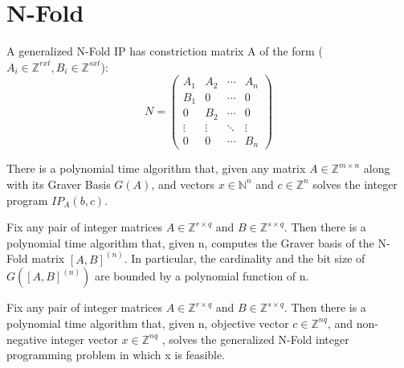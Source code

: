 \chapter{N-Fold} \label{methodology}



A generalized N-Fold IP has constriction matrix A of the form ($A_i \in \mathbb{Z}^{rxt}, B_i \in \mathbb{Z}^{sxt}$):\\
\begin{equation*}
N = 
\begin{pmatrix}
A_1 & A_2 & \cdots & A_n \\
B_1 & 0   & \cdots & 0 \\
0   & B_2 & \cdots & 0 \\
\vdots    & \vdots & \ddots & \vdots  \\
0   & 0   & \cdots & B_n 
\end{pmatrix}
\end{equation*}



\begin{proposition}
There is a polynomial time algorithm that, given any matrix $A \in \mathbb{Z}^{m \times n}$ along with its Graver Basis $G(A)$, and vectors $x \in \mathbb{N}^n$ and $c \in \mathbb{Z}^n$ solves the integer program $IP_A(b,c)$. 
\end{proposition}

\begin{proposition}
Fix any pair of integer matrices $A \in \mathbb{Z}^{r \times q}$ and $B \in \mathbb{Z}^{s \times q}$. Then there is a polynomial time algorithm that, given n, computes the Graver basis of the N-Fold matrix $[A,B]^{(n)}$. In particular, the cardinality and the bit size of $G([A, B]^(n))$ are bounded by a polynomial function of n.
\end{proposition}

\begin{proposition}
Fix any pair of integer matrices $A \in \mathbb{Z}^{r \times q}$ and $B \in \mathbb{Z}^{s \times q}$. Then there is a polynomial time algorithm that, given n, objective vector $c \in \mathbb{Z}^{nq}$, and non-negative integer vector $x \in \mathbb{Z}^{nq}$ , solves the generalized N-Fold integer programming problem in which x is feasible.
\end{proposition}

